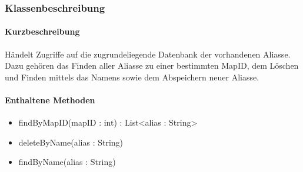 \subsubsection*{Klassenbeschreibung}%
\paragraph*{Kurzbeschreibung}
Händelt Zugriffe auf die zugrundeliegende Datenbank der vorhandenen Aliasse.
Dazu gehören das Finden aller Aliasse zu einer bestimmten MapID, dem Löschen und Finden mittels das Namens sowie
dem Abspeichern neuer Aliasse.
\paragraph*{Enthaltene Methoden}
\begin{itemize}
    \item findByMapID(mapID : int) : List<alias : String>
    \item deleteByName(alias : String) 
    \item findByName(alias : String)
\end{itemize}
